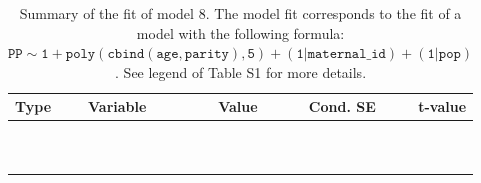 \begin{table}[H]

\caption{\label{tab:tab8}Summary of the fit of model 8. The model fit corresponds to the fit of a model with the following formula: {\small$\mathtt{PP \sim 1 + poly(cbind(age, parity), 5) + (1 | maternal\_id) + (1 | pop)}$}. See legend of Table S1 for more details.}
\centering
\fontsize{8}{10}\selectfont
\begin{tabular}[t]{>{\raggedright\arraybackslash}p{3cm}>{\raggedright\arraybackslash}p{5cm}rrr}
\toprule
Type & Variable & Value & Cond. SE & t-value\\
\midrule
\cellcolor{gray!6}{fixed effects} & \cellcolor{gray!6}{$\beta_1$} & \cellcolor{gray!6}{1.56} & \cellcolor{gray!6}{0.179} & \cellcolor{gray!6}{8.67}\\
\cellcolor{gray!6}{} & \cellcolor{gray!6}{$\beta_{\mathtt{age}}$} & \cellcolor{gray!6}{-421} & \cellcolor{gray!6}{59.7} & \cellcolor{gray!6}{-7.04}\\
\cellcolor{gray!6}{} & \cellcolor{gray!6}{$\beta_{\mathtt{age}^2}$} & \cellcolor{gray!6}{-185} & \cellcolor{gray!6}{51.8} & \cellcolor{gray!6}{-3.57}\\
\cellcolor{gray!6}{} & \cellcolor{gray!6}{$\beta_{\mathtt{age}^3}$} & \cellcolor{gray!6}{-43.4} & \cellcolor{gray!6}{32.6} & \cellcolor{gray!6}{-1.33}\\
\cellcolor{gray!6}{} & \cellcolor{gray!6}{$\beta_{\mathtt{age}^4}$} & \cellcolor{gray!6}{-15.8} & \cellcolor{gray!6}{14.4} & \cellcolor{gray!6}{-1.1}\\
\cellcolor{gray!6}{} & \cellcolor{gray!6}{$\beta_{\mathtt{age}^5}$} & \cellcolor{gray!6}{2.3} & \cellcolor{gray!6}{9.7} & \cellcolor{gray!6}{0.237}\\
\cellcolor{gray!6}{} & \cellcolor{gray!6}{$\beta_{\mathtt{parity}}$} & \cellcolor{gray!6}{48} & \cellcolor{gray!6}{97.7} & \cellcolor{gray!6}{0.491}\\
\cellcolor{gray!6}{} & \cellcolor{gray!6}{$\beta_{\mathtt{age}\times\mathtt{parity}}$} & \cellcolor{gray!6}{13240} & \cellcolor{gray!6}{39545} & \cellcolor{gray!6}{0.335}\\
\cellcolor{gray!6}{} & \cellcolor{gray!6}{$\beta_{\mathtt{age}^2\times\mathtt{parity}}$} & \cellcolor{gray!6}{-34019} & \cellcolor{gray!6}{30565} & \cellcolor{gray!6}{-1.11}\\
\cellcolor{gray!6}{} & \cellcolor{gray!6}{$\beta_{\mathtt{age}^3\times\mathtt{parity}}$} & \cellcolor{gray!6}{-330} & \cellcolor{gray!6}{14760} & \cellcolor{gray!6}{-0.0224}\\

\end{tabular}
\end{table}
